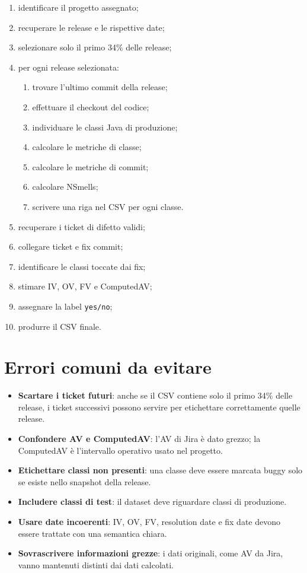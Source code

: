 \begin{enumerate}
    \item identificare il progetto assegnato;
    \item recuperare le release e le rispettive date;
    \item selezionare solo il primo 34\% delle release;
    \item per ogni release selezionata:
    \begin{enumerate}
        \item trovare l'ultimo commit della release;
        \item effettuare il checkout del codice;
        \item individuare le classi Java di produzione;
        \item calcolare le metriche di classe;
        \item calcolare le metriche di commit;
        \item calcolare NSmells;
        \item scrivere una riga nel CSV per ogni classe.
    \end{enumerate}
    \item recuperare i ticket di difetto validi;
    \item collegare ticket e fix commit;
    \item identificare le classi toccate dai fix;
    \item stimare IV, OV, FV e ComputedAV;
    \item assegnare la label \texttt{yes/no};
    \item produrre il CSV finale.
\end{enumerate}

\section{Errori comuni da evitare}

\begin{itemize}
    \item \textbf{Scartare i ticket futuri}: anche se il CSV contiene solo il primo 34\% delle release, i ticket successivi possono servire per etichettare correttamente quelle release.
    \item \textbf{Confondere AV e ComputedAV}: l'AV di Jira è dato grezzo; la ComputedAV è l'intervallo operativo usato nel progetto.
    \item \textbf{Etichettare classi non presenti}: una classe deve essere marcata buggy solo se esiste nello snapshot della release.
    \item \textbf{Includere classi di test}: il dataset deve riguardare classi di produzione.
    \item \textbf{Usare date incoerenti}: IV, OV, FV, resolution date e fix date devono essere trattate con una semantica chiara.
    \item \textbf{Sovrascrivere informazioni grezze}: i dati originali, come AV da Jira, vanno mantenuti distinti dai dati calcolati.
\end{itemize}

